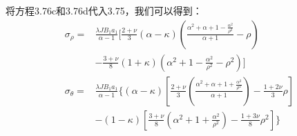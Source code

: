 将方程3.76c和3.76d代入3.75，我们可以得到：
\begin{subequations}
	\begin{align}
\sigma_\rho=&\frac{\lambda JB_1a_1}{\alpha-1}[\frac{2+\nu}{3}(\alpha-\kappa)(\frac{\alpha^2+\alpha+1-\frac{\alpha^2}{\rho^2}}{\alpha+1}-\rho) \\ \nonumber
&-\frac{3+\nu}{8}(1+\kappa)(\alpha^2+1-\frac{\alpha^2}{\rho^2}-\rho^2)]\\
\sigma_\theta=&\frac{\lambda JB_1a_1}{\alpha-1}\{(\alpha-\kappa)[\frac{2+\nu}{3}(\frac{\alpha^2+\alpha+1+{\frac{\alpha^2}{\rho^2}}}{\alpha+1})-\frac{1+2\nu}{3}\rho] \\ \nonumber
&-(1-\kappa)[\frac{3+\nu}{8}(\alpha^2+1+\frac{\alpha^2}{\rho^2})-\frac{1+3\nu}{8}\rho^2]\}
	\end{align}
\end{subequations}

